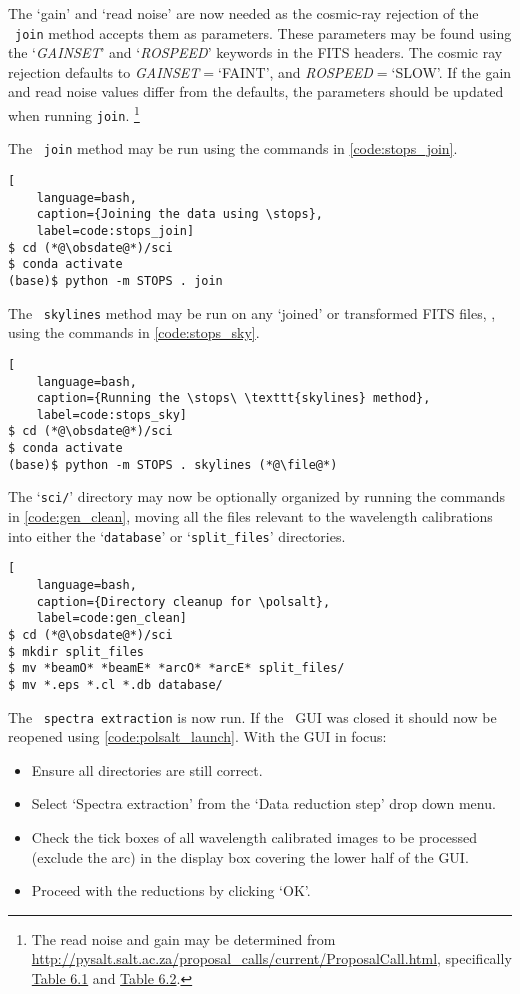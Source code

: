 The `gain' and `read noise' are now needed as the cosmic-ray rejection of the \stops\ \texttt{join} method accepts them as parameters. These parameters may be found using the `\textit{GAINSET}' and `\textit{ROSPEED}' keywords in the \gls{FITS} headers. The cosmic ray rejection defaults to \textit{GAINSET}$ = $`FAINT', and \textit{ROSPEED}$ = $`SLOW'. If the gain and read noise values differ from the defaults, the parameters should be updated when running \texttt{join}.%
\footnote{The read noise and gain may be determined from \protect\url{http://pysalt.salt.ac.za/proposal_calls/current/ProposalCall.html}, specifically \href{http://pysalt.salt.ac.za/proposal_calls/current/ProposalCall.html\#t.4}{Table 6.1} and \href{http://pysalt.salt.ac.za/proposal_calls/current/ProposalCall.html\#t.5}{Table 6.2}.}

The \stops\ \texttt{join} method may be run using the commands in \autoref{code:stops_join}.

\begin{lstlisting}[
    language=bash,
    caption={Joining the data using \stops},
    label=code:stops_join]
$ cd (*@\obsdate@*)/sci
$ conda activate
(base)$ python -m STOPS . join
\end{lstlisting}

The \stops\ \texttt{skylines} method may be run on any `joined' or transformed \gls{FITS} files, \file, using the commands in \autoref{code:stops_sky}.

\begin{lstlisting}[
    language=bash,
    caption={Running the \stops\ \texttt{skylines} method},
    label=code:stops_sky]
$ cd (*@\obsdate@*)/sci
$ conda activate
(base)$ python -m STOPS . skylines (*@\file@*)
\end{lstlisting}

The `\texttt{sci/}' directory may now be optionally organized by running the commands in \autoref{code:gen_clean}, moving all the files relevant to the wavelength calibrations into either the `\texttt{database}' or `\texttt{split\_files}' directories.

\begin{lstlisting}[
    language=bash,
    caption={Directory cleanup for \polsalt},
    label=code:gen_clean]
$ cd (*@\obsdate@*)/sci
$ mkdir split_files
$ mv *beamO* *beamE* *arcO* *arcE* split_files/
$ mv *.eps *.cl *.db database/
\end{lstlisting}

The \polsalt\ \texttt{spectra extraction} is now run. If the \polsalt\ \gls{GUI} was closed it should now be reopened using \autoref{code:polsalt_launch}. With the \gls{GUI} in focus:
\begin{itemize}
    \item Ensure all directories are still correct.
    \item Select `Spectra extraction' from the `Data reduction step' drop down menu.
    \item Check the tick boxes of all wavelength calibrated images to be processed (exclude the arc) in the display box covering the lower half of the \gls{GUI}.
    \item Proceed with the reductions by clicking `OK'.
\end{itemize}

